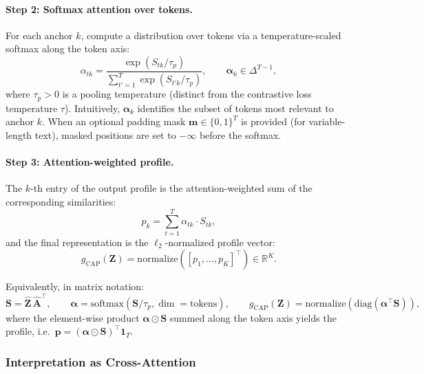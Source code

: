\paragraph{Step 2: Softmax attention over tokens.}
For each anchor $k$, compute a distribution over tokens via a temperature-scaled softmax along the token axis:
\begin{equation}
    \alpha_{tk} = \frac{\exp(S_{tk} / \tau_p)}{\sum_{t'=1}^{T} \exp(S_{t'k} / \tau_p)},
    \qquad
    \boldsymbol{\alpha}_k \in \Delta^{T-1},
    \label{eq:attn_weights}
\end{equation}
where $\tau_p > 0$ is a pooling temperature (distinct from the contrastive loss temperature $\tau$).  Intuitively, $\boldsymbol{\alpha}_k$ identifies the subset of tokens most relevant to anchor $k$.  When an optional padding mask $\mathbf{m} \in \{0,1\}^T$ is provided (for variable-length text), masked positions are set to $-\infty$ before the softmax.

\paragraph{Step 3: Attention-weighted profile.}
The $k$-th entry of the output profile is the attention-weighted sum of the corresponding similarities:
\begin{equation}
    p_k = \sum_{t=1}^{T} \alpha_{tk} \cdot S_{tk},
    \label{eq:profile_entry}
\end{equation}
and the final representation is the $\ell_2$-normalized profile vector:
\begin{equation}
    g_{\mathrm{CAP}}(\mathbf{Z}) = \mathrm{normalize}\!\left([p_1, \ldots, p_K]^\top\right) \in \mathbb{R}^K.
    \label{eq:cap_output}
\end{equation}

Equivalently, in matrix notation:
\begin{equation}
    \mathbf{S} = \hat{\mathbf{Z}} \, \hat{\mathbf{A}}^\top, \qquad
    \boldsymbol{\alpha} = \mathrm{softmax}(\mathbf{S} / \tau_p, \dim=\text{tokens}), \qquad
    g_{\mathrm{CAP}}(\mathbf{Z}) = \mathrm{normalize}\!\left(\mathrm{diag}(\boldsymbol{\alpha}^\top \mathbf{S})\right),
    \label{eq:cap_matrix}
\end{equation}
where the element-wise product $\boldsymbol{\alpha} \odot \mathbf{S}$ summed along the token axis yields the profile, i.e.\ $\mathbf{p} = (\boldsymbol{\alpha} \odot \mathbf{S})^\top \mathbf{1}_T$.

\subsubsection{Interpretation as Cross-Attention}

